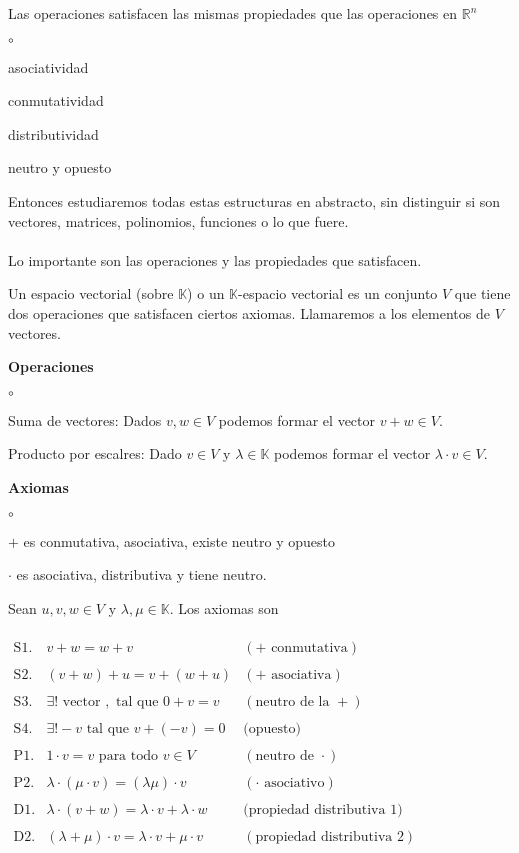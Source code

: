 \documentclass{article}
\theoremstyle{definition}
\theoremstyle{definition}
\theoremstyle{remark}
\begin{document}
Las operaciones satisfacen las mismas propiedades que las operaciones en $\mathbb{R}^n$ 
\begin{list}{$\circ$}{}  
\item asociatividad 
\item conmutatividad
\item distributividad
\item neutro y opuesto
\end{list}
Entonces estudiaremos todas estas estructuras en abstracto, sin distinguir si son vectores, matrices, polinomios, funciones o lo que fuere.\\\\
Lo importante son las operaciones y las propiedades que satisfacen. 


\begin{defi}
  Un espacio vectorial (sobre $\mathbb{K}$) o un $\mathbb{K}$-espacio vectorial es un conjunto $V$ que tiene dos operaciones que satisfacen ciertos axiomas. Llamaremos a los elementos de $V$ vectores.
\end{defi}
\textbf{Operaciones}
\begin{list}{$\circ$}{}  
\item Suma de vectores: Dados $v,w \in V$ podemos formar el vector $v+w \in V$.
\item Producto por escalres: Dado $v \in V$ y $\lambda \in \mathbb{K}$ podemos formar el vector $\lambda \cdot v \in V$.
\end{list}
\textbf{Axiomas}
\begin{list}{$\circ$}{}  
\item $+$ es conmutativa, asociativa, existe neutro y opuesto 
\item $\cdot $ es asociativa, distributiva y tiene neutro.
\end{list}
Sean $u,v,w \in V$ y $\lambda,\mu \in \mathbb{K}$. Los axiomas son \\\\
$\begin{array}{lll} 
  \text{S1.} & v+w=w+v & (+ \text{ conmutativa}) \\\\
    \text{S2.} & (v+w)+u=v+(w+u) & (+ \text{ asociativa}) \\\\
    \text{S3.} & \exists ! \text{ vector } , \text{ tal que } 0 + v = v & (\text{neutro de la } +) \\\\
  \text{S4.} & \exists  ! -v \text{ tal que }v +(-v)=0 & \text{(opuesto)} \\\\
  \text{P1.} & 1 \cdot v = v \text{ para todo } v \in V & (\text{neutro de }\cdot) \\\\
  \text{P2.} & \lambda \cdot (\mu \cdot v) = (\lambda \mu ) \cdot v & (\cdot \text{ asociativo}) \\\\
  \text{D1.} & \lambda \cdot (v+w)=\lambda \cdot v + \lambda \cdot w & \text{(propiedad distributiva } 1) \\\\
  \text{D2.} & (\lambda + \mu ) \cdot v = \lambda \cdot v + \mu \cdot v & (\text{propiedad distributiva } 2)
\end{array}$
\end{document}
